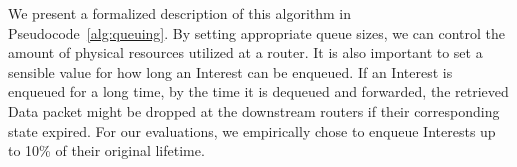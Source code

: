 We present a formalized description of this algorithm in Pseudocode~\ref{alg:queuing}. 
By setting appropriate queue sizes, we can control the amount of physical resources utilized at a router.
It is also important to set a sensible value for how long an Interest can be enqueued. 
If an Interest is enqueued for a long time, by the time it is dequeued and forwarded, the retrieved Data packet might be dropped at the downstream routers if their corresponding state expired. 
For our evaluations, we empirically chose to enqueue Interests up to 10\% of their original lifetime.






